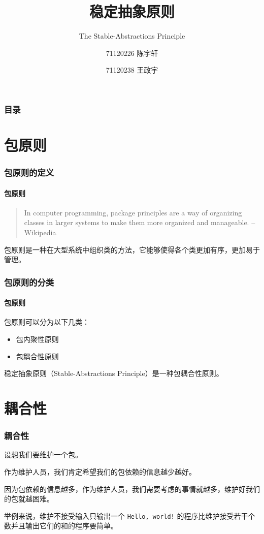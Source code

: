 \documentclass{ctexbeamer}
\title{稳定抽象原则}
\subtitle{The Stable-Abstractions Principle}
\author{
    71120226 陈宇轩 \and 71120238 王政宇
}
\begin{document}
    \begin{frame}
        \titlepage
    \end{frame}

    \begin{frame}
        \frametitle{目录}
    
        \tableofcontents
    \end{frame}

    \section{包原则}
    \begin{frame}
        \frametitle{包原则的定义}
        \framesubtitle{包原则}
    
        \begin{quotation}
            In computer programming, package principles are a way of organizing classes in larger systems to make them more organized and manageable. --Wikipedia
        \end{quotation}

        包原则是一种在大型系统中组织类的方法，它能够使得各个类更加有序，更加易于管理。
    \end{frame}

    \begin{frame}
        \frametitle{包原则的分类}
        \framesubtitle{包原则}
    
        包原则可以分为以下几类：\pause

        \begin{itemize}
            \item 包内聚性原则\pause
            \item 包耦合性原则\pause
        \end{itemize}

        稳定抽象原则（Stable-Abstractions Principle）是一种包耦合性原则。
    \end{frame}

    \section{耦合性}
    \begin{frame}[fragile]
        \frametitle{耦合性}

        设想我们要维护一个包。\pause

        作为维护人员，我们肯定希望我们的包依赖的信息越少越好。\pause

        因为包依赖的信息越多，作为维护人员，我们需要考虑的事情就越多，维护好我们的包就越困难。\pause

        举例来说，维护不接受输入只输出一个 \verb|Hello, world!| 的程序比维护接受若干个数并且输出它们的和的程序要简单。
    \end{frame}
\end{document}
